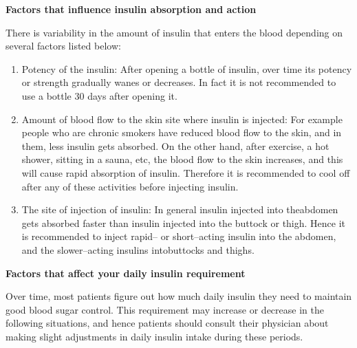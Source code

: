 \noindent\textbf{Factors that influence insulin absorption and action}

There is variability in the amount of insulin that enters the blood depending on several factors listed below:

\vspace{-\topsep}
\begin{enumerate}[•]
\itemsep=0pt
\item Potency of the insulin: After opening a bottle of insulin, over time its potency or strength gradually wanes or decreases. In fact it is not recommended to use a bottle 30 days after opening it.
\item Amount of blood flow to the skin site where insulin is injected: For example people who are chronic smokers have reduced blood flow to the skin, and in them, less insulin gets absorbed. On the other hand, after exercise, a hot shower, sitting in a sauna, etc, the blood flow to the skin increases, and this will cause rapid absorption of insulin. Therefore it is recommended to cool off after any of these activities before injecting insulin.
\item The site of injection of insulin: In general insulin injected into the\break abdomen gets absorbed faster than insulin injected into the buttock or thigh. Hence it is recommended to inject rapid– or short–acting insulin into the abdomen, and the slower–acting insulins into\break buttocks and thighs.
\end{enumerate}

\clearpage

\noindent\textbf{Factors that affect your daily insulin requirement}

Over time, most patients figure out how much daily insulin they need to maintain good blood sugar control. This requirement may increase or decrease in the following situations, and hence patients should consult their physician about making slight adjustments in daily insulin intake during these periods.

